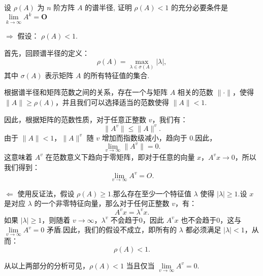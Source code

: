 \begin{tcolorbox}[enhanced,colback=10,colframe=9,breakable,coltitle=green!25!black,title=2024]

设 $ \rho(A) $ 为 $ {n} $ 阶方阵 $ A $ 的谱半径, 证明
$ \rho(A)<1 $ 的充分必要条件是 $ \lim\limits _{k \rightarrow \infty} A^{k}=\boldsymbol{O} $
\tcblower


$\Rightarrow$ 假设： $\rho(A) < 1$.

首先，回顾谱半径的定义：
$$
\rho(A) = \max_{\lambda \in \sigma(A)} |\lambda|,
$$
其中 $\sigma(A)$ 表示矩阵 $A$ 的所有特征值的集合.

根据谱半径和矩阵范数之间的关系，存在一个与矩阵 $A$ 相关的范数 $\|\cdot\|$，使得 $\|A\| \geq \rho(A)$，并且我们可以选择适当的范数使得 $\|A\| < 1$.

因此，根据矩阵的范数性质，对于任意正整数 $v$，我们有：
$$
\|A^v\| \leq \|A\|^v.
$$
由于 $\|A\| < 1$，$\|A\|^v$ 随 $v$ 增加而指数级减小，趋向于 $0$.因此，
$$
\lim_{v \rightarrow \infty} \|A^v\| = 0.
$$
这意味着 $A^v$ 在范数意义下趋向于零矩阵，即对于任意的向量 $x$，$A^v x \to 0$，所以我们得到：
$$
\lim_{v \rightarrow \infty} A^v = O.
$$


$\Leftarrow$ 使用反证法，假设 $\rho(A) \geq 1$.那么存在至少一个特征值 $\lambda$ 使得 $|\lambda| \geq 1$.设 $x$ 是对应 $\lambda$ 的一个非零特征向量，那么对于任何正整数 $v$，有：
$$
A^v x = \lambda^v x.
$$
如果 $|\lambda| \geq 1$，则随着 $v \to \infty$，$\lambda^v$ 不会趋于0，因此 $A^v x$ 也不会趋于0，这与 $\lim\limits_{v \rightarrow \infty} A^v = 0$ 矛盾.因此，我们的假设不成立，即所有的 $\lambda$ 都必须满足 $|\lambda| < 1$，从而：
$$
\rho(A) < 1.
$$

从以上两部分的分析可见，$\rho(A) < 1$ 当且仅当 $\lim\limits_{v \rightarrow \infty} A^v = 0$.
\end{tcolorbox}

